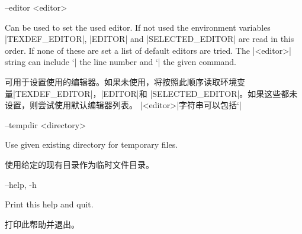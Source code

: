 \documentclass{article}
\newenvironment{options}{%
    \def\cstart{\begingroup\ttfamily\par\noindent\ignorespaces}%
    \def\csep{\endgroup\begingroup\list {}{}\item \relax}%
    \def\cend{\endlist\par\medskip\endgroup\cstart}%
    \cstart
}{%
    \endgroup
}
\begin{document}
\begin{options}
--editor <editor>                                  \csep 
Can be used to set the used editor. If not used the environment variables |TEXDEF_EDITOR|, |EDITOR| and
|SELECTED_EDITOR| are read in this order. If none of these are set a list of default
editors are tried.  The |<editor>| string can include `|%
the line number and `|%
the given command.

可用于设置使用的编辑器。如果未使用，将按照此顺序读取环境变量|TEXDEF_EDITOR|，|EDITOR|和 |SELECTED_EDITOR|。如果这些都未设置，则尝试使用默认编辑器列表。 |<editor>|字符串可以包括`|%
\cend
\end{options}

\begin{options}
--tempdir <directory>                              \csep 
Use given existing directory for temporary files.

使用给定的现有目录作为临时文件目录。
\cend
\end{options}

\begin{options}
--help, -h                                         \csep Print this help and quit.


打印此帮助并退出。
\cend
\end{options}

\begin{parcolumns}[rulebetween=true,colwidths={1=.52\linewidth}]{2}
\end{parcolumns}
\end{document}
